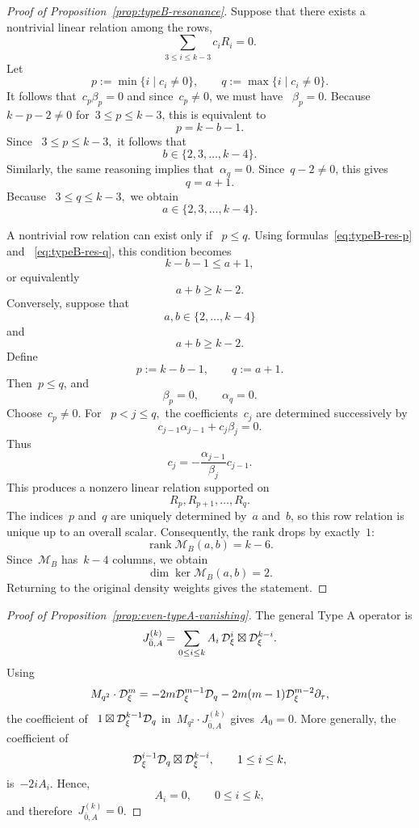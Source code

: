 \documentclass[12pt,a4paper]{amsart}
\theoremstyle{thm}
\theoremstyle{definition}
\newcommand {\Dq}{\cD_q}
\newcommand {\Dxi}{\cD_\xi}
\begin{document}
\begin{proof}[Proof of Proposition~\textup{\ref{prop:typeB-resonance}}]
Suppose that there exists a nontrivial linear relation among the rows,
\[
\sum_{3\leq i\leq k-3}c_iR_i=0.
\]
Let
\[
p:=\min\{i\mid c_i\neq0\},
\qquad
q:=\max\{i\mid c_i\neq0\}.
\]
It follows that~$
c_p\beta_p=0
$ and since~\(c_p\neq0\), we must have~%
$
\beta_p=0.
$
Because~%
$
k-p-2\neq0
$
for~\(3\leq p\leq k-3\), this is equivalent to
\begin{equation}
p=k-b-1.
\label{eq:typeB-res-p}
\end{equation}
Since~%
$
3\leq p\leq k-3,
$
it follows that
\begin{equation*}
b\in\{2,3,\ldots,k-4\}.
\end{equation*}
Similarly, the same reasoning implies that~$
\alpha_q=0.
$ Since~\(q-2\neq0\), this gives
\begin{equation}
q=a+1.
\label{eq:typeB-res-q}
\end{equation}
Because~%
$
3\leq q\leq k-3,
$
we obtain
\begin{equation*}
a\in\{2,3,\ldots,k-4\}.
\end{equation*}

A nontrivial row relation can exist only if~%
$
p\leq q.
$ Using formulas~\eqref{eq:typeB-res-p} and~%
\eqref{eq:typeB-res-q}, this condition becomes
\[
k-b-1\leq a+1,
\]
or equivalently
\begin{equation*}
a+b\geq k-2.
\end{equation*}
Conversely, suppose that
\[
a,b\in\{2,\ldots,k-4\}
\]
and
\[
a+b\geq k-2.
\]
Define
\[
p:=k-b-1,
\qquad
q:=a+1.
\]
Then~\(p\leq q\), and
\[
\beta_p=0,
\qquad
\alpha_q=0.
\]
Choose~\(c_p\neq0\). For~%
$
p<j\leq q,
$
the coefficients~\(c_j\) are determined successively by
\[
c_{j-1}\alpha_{j-1}+c_j\beta_j=0.
\]
Thus
\[
c_j
=
-\frac{\alpha_{j-1}}{\beta_j}c_{j-1}.
\]
This produces a nonzero linear relation supported on
\[
R_p,R_{p+1},\ldots,R_q.
\]
The indices~\(p\) and~\(q\) are uniquely determined by~\(a\) and~\(b\),
so this row relation is unique up to an overall scalar. Consequently,
the rank drops by exactly~$1$:
\[
\operatorname{rank}\mathcal M_B(a,b)=k-6.
\]
Since~\(\mathcal M_B\) has~\(k-4\) columns, we obtain
\[
\dim\ker\mathcal M_B(a,b)=2.
\]
Returning to the original density weights gives the
statement.
\end{proof}

\begin{proof}[Proof of Proposition~\textup{\ref{prop:even-typeA-vanishing}}]
The general Type A operator is
\[
J_{\bar0,A}^{(k)}
=
\sum_{0\leq i\leq k}
A_i\,\Dxi^i\boxtimes \Dxi^{k-i}.
\]
Using
\[
M_{q^2}\cdot \Dxi^m
=
-2m\Dxi^{m-1}\Dq
-2m(m-1)\Dxi^{m-2}\partial_\tau,
\]
the coefficient of~%
$
1\boxtimes \Dxi^{k-1}\Dq
$ in~\(M_{q^2}\cdot J_{\bar0,A}^{(k)}\) gives~\(A_0=0\).
More generally, the coefficient of
\[
\Dxi^{i-1}\Dq\boxtimes \Dxi^{k-i},
\qquad 1\leq i\leq k,
\]
is~\(-2iA_i\). Hence,
\[
A_i=0,\qquad 0\leq i\leq k,
\]
and therefore~\(J_{\bar0,A}^{(k)}=0\).
\end{proof}
\end{document}
